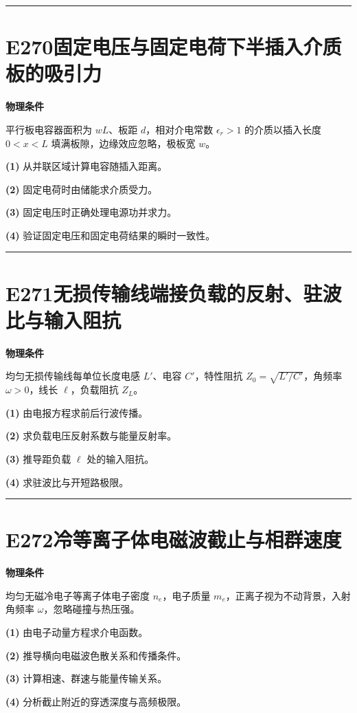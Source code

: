 \documentclass[UTF8,a4paper,11pt,oneside,openany]{ctexbook}
\begin{document}
\par\bigskip\hrule\bigskip
\section*{E270\quad 固定电压与固定电荷下半插入介质板的吸引力}
\textbf{物理条件}\par 平行板电容器面积为 \(wL\)、板距 \(d\)，相对介电常数 \(\epsilon_r>1\) 的介质以插入长度 \(0<x<L\) 填满板隙，边缘效应忽略，极板宽 \(w\)。
\par\noindent\textbf{(1)} 从并联区域计算电容随插入距离。
\par\noindent\textbf{(2)} 固定电荷时由储能求介质受力。
\par\noindent\textbf{(3)} 固定电压时正确处理电源功并求力。
\par\noindent\textbf{(4)} 验证固定电压和固定电荷结果的瞬时一致性。

\par\bigskip\hrule\bigskip
\section*{E271\quad 无损传输线端接负载的反射、驻波比与输入阻抗}
\textbf{物理条件}\par 均匀无损传输线每单位长度电感 \(L'\)、电容 \(C'\)，特性阻抗 \(Z_0=\sqrt{L'/C'}\)，角频率 \(\omega>0\)，线长 \(\ell\)，负载阻抗 \(Z_L\)。
\par\noindent\textbf{(1)} 由电报方程求前后行波传播。
\par\noindent\textbf{(2)} 求负载电压反射系数与能量反射率。
\par\noindent\textbf{(3)} 推导距负载 \(\ell\) 处的输入阻抗。
\par\noindent\textbf{(4)} 求驻波比与开短路极限。

\par\bigskip\hrule\bigskip
\section*{E272\quad 冷等离子体电磁波截止与相群速度}
\textbf{物理条件}\par 均匀无磁冷电子等离子体电子密度 \(n_e\)，电子质量 \(m_e\)，正离子视为不动背景，入射角频率 \(\omega\)，忽略碰撞与热压强。
\par\noindent\textbf{(1)} 由电子动量方程求介电函数。
\par\noindent\textbf{(2)} 推导横向电磁波色散关系和传播条件。
\par\noindent\textbf{(3)} 计算相速、群速与能量传输关系。
\par\noindent\textbf{(4)} 分析截止附近的穿透深度与高频极限。
\end{document}
